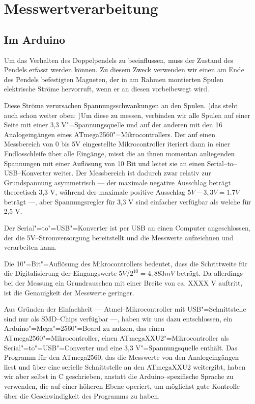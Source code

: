 \section{Messwertverarbeitung}

\subsection{Im Arduino}

Um das Verhalten des Doppelpendels zu beeinflussen, muss der Zustand des Pendels
erfasst werden können. Zu diesem Zweck verwenden wir einen am Ende des Pendels
befestigten Magneten, der in am Rahmen montierten Spulen elektrische Ströme
hervorruft, wenn er an diesen vorbeibewegt wird.

Diese Ströme verursachen Spannungsschwankungen an den Spulen. (\TODO das steht auch schon weiter oben: )Um diese zu messen,
verbinden wir alle Spulen auf einer Seite mit einer 3,3 V"=Spannungsquelle und auf der
anderen mit den 16 Analogeingängen eines ATmega2560"=Mikrocontrollers. Der auf einen
Messbereich von 0 bis 5V eingestellte Mikrocontroller iteriert dann in einer Endlosschleife
über alle Eingänge, misst die an ihnen momentan anliegenden Spannungen mit einer
Auflösung von 10 Bit und leitet sie an einen Serial--to--USB--Konverter weiter. Der Messbereich
ist dadurch zwar relativ zur Grundspannung asymmetrisch --- der maximale negative Ausschlag beträgt
theoretisch 3,3 V, während der maximale positive Ausschlag $ 5V - 3,3 V = 1.7 V $ beträgt ---, aber
Spannungsregler für 3,3 V sind einfacher verfügbar als welche für 2,5 V.

Der Serial"=to"=USB"=Konverter ist per USB an einen Computer angeschlossen, der die 5V--Stromversorgung
bereitstellt und die Messwerte aufzeichnen und verarbeiten kann.

Die 10"=Bit"=Auflösung des Mikrocontrollers bedeutet, dass die Schrittweite für die Digitalisierung
der Eingangswerte $ 5 V / 2^{10} = 4,883 mV $ beträgt. Da allerdings bei der Messung ein
Grundrauschen mit einer Breite von ca. \TODO XXXX V auftritt, ist die Genauigkeit der Messwerte geringer.

Aus Gründen der Einfachheit --- Atmel--Mikrocontroller mit USB"=Schnittstelle sind nur als SMD--Chips
verfügbar ---, haben wir uns dazu entschlossen, ein Arduino"=Mega"=2560"=Board zu nutzen, das einen
ATmega2560"=Mikrocontroller, einen \TODO ATmegaXXU2"=Mikrocontroller als Serial"=to"=USB"=Converter und eine 
3,3 V"=Spannungsquelle enthält. Das Programm für den ATmega2560, das die Messwerte von den
Analogeingängen liest und über eine serielle Schnittstelle an den \TODO ATmegaXXU2 weitergibt, haben
wir aber selbst in C geschrieben, anstatt die Arduino--spezifische Sprache zu verwenden, die auf
einer höheren Ebene operiert, um möglichst gute Kontrolle über die Geschwindigkeit des Programms
zu haben.

